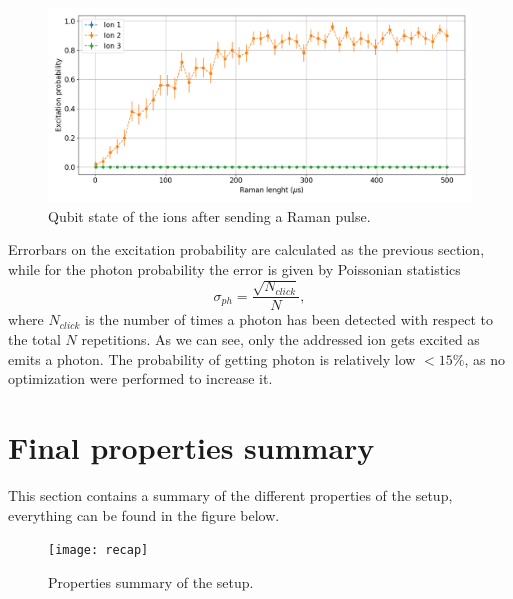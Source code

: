 \begin{figure}[H]
\centering
\includegraphics[width=\textwidth]{img/ramanlength_witherrors}
\caption{Qubit state of the ions after sending a Raman pulse.}
\label{probion}
\end{figure}
Errorbars on the excitation probability are calculated as the previous section, while for the photon probability the error is given by Poissonian statistics \cite{quantumoptics}
\begin{equation}
\sigma_{ph} = \frac{\sqrt{N_{click}}}{N},
\end{equation}
where $N_{click}$ is the number of times a photon has been detected with respect to the total $N$ repetitions.
As we can see, only the addressed ion gets excited as emits a photon. The probability of getting photon is relatively low $<15 \%$, as no optimization were performed to increase it.

\section{Final properties summary}
This section contains a summary of the different properties of the setup, everything can be found in the figure below.
\begin{figure}[H]
\centering
\texttt{[image: recap]}
\caption{Properties summary of the setup.}
\end{figure}
